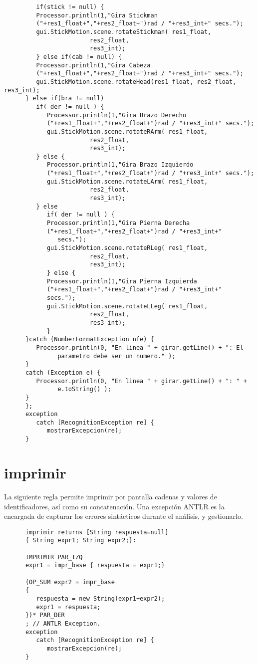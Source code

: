 \begin{lstlisting}
         if(stick != null) {
         Processor.println(1,"Gira Stickman 
         ("+res1_float+","+res2_float+")rad / "+res3_int+" secs.");
         gui.StickMotion.scene.rotateStickman( res1_float, 
                        res2_float, 
                        res3_int);
         } else if(cab != null) {
         Processor.println(1,"Gira Cabeza 
         ("+res1_float+","+res2_float+")rad / "+res3_int+" secs.");
         gui.StickMotion.scene.rotateHead(res1_float, res2_float, res3_int);
      } else if(bra != null)
         if( der != null ) {
            Processor.println(1,"Gira Brazo Derecho 
            ("+res1_float+","+res2_float+")rad / "+res3_int+" secs.");
            gui.StickMotion.scene.rotateRArm( res1_float, 
                        res2_float, 
                        res3_int);
         } else {
            Processor.println(1,"Gira Brazo Izquierdo 
            ("+res1_float+","+res2_float+")rad / "+res3_int+" secs.");
            gui.StickMotion.scene.rotateLArm( res1_float, 
                        res2_float, 
                        res3_int);
         } else 
            if( der != null ) {
            Processor.println(1,"Gira Pierna Derecha 
            ("+res1_float+","+res2_float+")rad / "+res3_int+"
               secs.");
            gui.StickMotion.scene.rotateRLeg( res1_float, 
                        res2_float,
                        res3_int);
            } else {
            Processor.println(1,"Gira Pierna Izquierda 
            ("+res1_float+","+res2_float+")rad / "+res3_int+"
            secs.");
            gui.StickMotion.scene.rotateLLeg( res1_float,
                        res2_float,
                        res3_int);
            }
      }catch (NumberFormatException nfe) {
         Processor.println(0, "En linea " + girar.getLine() + ": El 
               parametro debe ser un numero." );
      } 
      catch (Exception e) {
         Processor.println(0, "En linea " + girar.getLine() + ": " +
               e.toString() );
      }
      };
      exception
         catch [RecognitionException re] {
            mostrarExcepcion(re);
      }
   \end{lstlisting}

   \section{imprimir}
   La siguiente regla permite imprimir por pantalla cadenas y valores de identificadores, así como su concatenación. Una excepción
   ANTLR es la encargada de capturar los errores sintácticos durante el análisis, y gestionarlo.
   \begin{lstlisting}
      imprimir returns [String respuesta=null]
      { String expr1; String expr2;}:
      
      IMPRIMIR PAR_IZQ
      expr1 = impr_base { respuesta = expr1;}
      
      (OP_SUM expr2 = impr_base
      {
         respuesta = new String(expr1+expr2);
         expr1 = respuesta;
      })* PAR_DER
      ; // ANTLR Exception.
      exception
         catch [RecognitionException re] {
            mostrarExcepcion(re);
      }
   \end{lstlisting}

